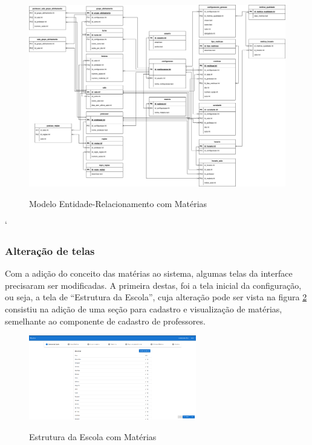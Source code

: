 \begin{figure}[!htb]
	\centering
	\caption{Modelo Entidade-Relacionamento com Matérias}
	\includegraphics[width=1\textwidth]{./dados/figuras/ER_horario_INCREMENTO6}
	\label{fig:modelagemMateiras}
\end{figure}
\pagebreak`

\subsubsection{Alteração de telas}
Com a adição do conceito das matérias ao sistema, algumas telas da interface precisaram ser modificadas. A primeira destas, foi a tela inicial da configuração, ou seja, a tela de ``Estrutura da Escola'', cuja alteração pode ser vista na figura \ref{fig:estruturaAtualizada} consistiu na adição de uma seção para cadastro e visualização de matérias, semelhante ao componente de cadastro de professores.

\begin{figure}[!htb]
	\centering
	\caption{Estrutura da Escola com Matérias}
	\includegraphics[width=0.65\textwidth]{./dados/figuras/alteracaoEstrutura}
	\label{fig:estruturaAtualizada}
\end{figure}
\pagebreak

